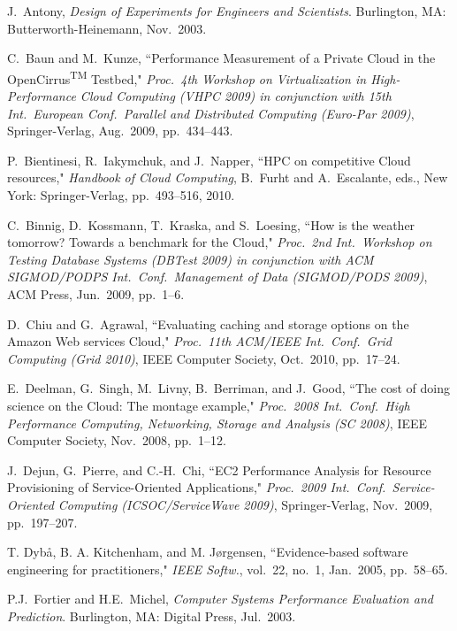 \documentclass[10pt, conference, compsocconf]{IEEEtran}
\begin{document}
\begin{thebibliography}{99}
\itemsep 3pt

J.~Antony, \emph{Design of Experiments for Engineers and Scientists}. Burlington, MA: Butterworth-Heinemann, Nov.~2003.

C.~Baun and M.~Kunze, ``Performance Measurement of a Private Cloud in the OpenCirrus\textsuperscript{TM} Testbed," \emph{Proc.~4th Workshop on Virtualization in High-Performance Cloud Computing (VHPC 2009) in conjunction with 15th Int.~European Conf.~Parallel and Distributed Computing (Euro-Par 2009)}, Springer-Verlag, Aug.~2009, pp.~434--443.

P.~Bientinesi, R.~Iakymchuk, and J.~Napper, ``HPC on competitive Cloud resources," \emph{Handbook of Cloud Computing}, B.~Furht and A.~Escalante, eds., New York: Springer-Verlag, pp.~493--516, 2010.

C.~Binnig, D.~Kossmann, T.~Kraska, and S.~Loesing, ``How is the weather tomorrow? Towards a benchmark for the Cloud," \emph{Proc.~2nd Int.~Workshop on Testing Database Systems (DBTest 2009) in conjunction with ACM SIGMOD/PODPS Int.~Conf.~Management of Data (SIGMOD/PODS 2009)}, ACM Press, Jun.~2009, pp.~1--6.

D.~Chiu and G.~Agrawal, ``Evaluating caching and storage options on the Amazon Web services Cloud," \emph{Proc.~11th ACM/IEEE Int.~Conf.~Grid Computing (Grid 2010)}, IEEE Computer Society, Oct.~2010, pp.~17--24.

E.~Deelman, G.~Singh, M.~Livny, B.~Berriman, and J.~Good, ``The cost of doing science on the Cloud: The montage example," \emph{Proc.~2008 Int.~Conf.~High Performance Computing, Networking, Storage and Analysis (SC 2008)}, IEEE Computer Society, Nov.~2008, pp.~1--12.

J.~Dejun, G.~Pierre, and C.-H.~Chi, ``EC2 Performance Analysis for Resource Provisioning of Service-Oriented Applications," \emph{Proc.~2009 Int.~Conf.~Service-Oriented Computing (ICSOC/ServiceWave 2009)}, Springer-Verlag, Nov.~2009, pp.~197--207.

T. Dyb\aa, B. A. Kitchenham, and M. J\o rgensen, ``Evidence-based software engineering for practitioners," \emph{IEEE Softw.}, vol.~22, no.~1, Jan.~2005, pp.~58--65.

P.J.~Fortier and H.E.~Michel, \emph{Computer Systems Performance Evaluation and Prediction}. Burlington, MA: Digital Press, Jul.~2003.


\end{thebibliography}
\end{document}
